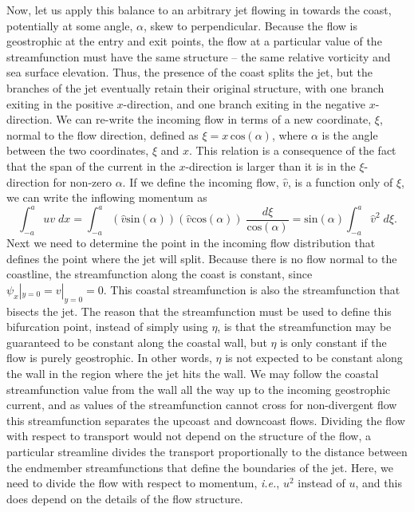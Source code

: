 \documentclass[11pt]{report}
\numberwithin{equation}{section}
\begin{document}
Now, let us apply this balance to an arbitrary jet flowing in towards the coast, potentially at some angle, $\alpha$, skew to perpendicular.  Because the flow is geostrophic at the entry and exit points, the flow at a particular value of the streamfunction must have the same structure -- the same relative vorticity and sea surface elevation.  Thus, the presence of the coast splits the jet, but the branches of the jet eventually retain their original structure, with one branch exiting in the positive $x$-direction, and one branch exiting in the negative $x$-direction.  We can re-write the incoming flow in terms of a new coordinate, $\xi$, normal to the flow direction, defined as $\xi = x\,\mathrm{cos}(\alpha)$, where $\alpha$ is the angle between the two coordinates, $\xi$ and $x$.  This relation is a consequence of the fact that the span of the current in the $x$-direction is larger than it is in the $\xi$-direction for non-zero $\alpha$.  If we define the incoming flow, $\hat{v}$, is a function only of $\xi$, we can write the inflowing momentum as
\begin{equation}
    \int_{-a}^{a} u v\;dx = 
        \int_{-a}^{a} (\hat{v}\mathrm{sin}(\alpha))
                      (\hat{v}\mathrm{cos}(\alpha))\;\frac{d\xi}{\mathrm{cos}(\alpha)}
        = \mathrm{sin}(\alpha) \int_{-a}^{a} \hat{v}^2\;d\xi.    
\end{equation}
Next we need to determine the point in the incoming flow distribution that defines the point where the jet will split.  Because there is no flow normal to the coastline, the streamfunction along the coast is constant, since $\psi_x|_{y=0} = v|_{y=0} = 0$.  This coastal streamfunction is also the streamfunction that bisects the jet.  The reason that the streamfunction must be used to define this bifurcation point, instead of simply using $\eta$, is that the streamfunction may be guaranteed to be constant along the coastal wall, but $\eta$ is only constant if the flow is purely geostrophic. In other words, $\eta$ is not expected to be constant along the wall in the region where the jet hits the wall.  We may follow the coastal streamfunction value from the wall all the way up to the incoming geostrophic current, and as values of the streamfunction cannot cross for non-divergent flow this streamfunction separates the upcoast and downcoast flows.   Dividing the flow with respect to transport would not depend on the structure of the flow, a particular streamline divides the transport proportionally to the distance between the endmember streamfunctions that define the boundaries of the jet.  Here, we need to divide the flow with respect to momentum, \emph{i.e.}, $u^2$ instead of $u$, and this does depend on the details of the flow structure.  
\end{document}
